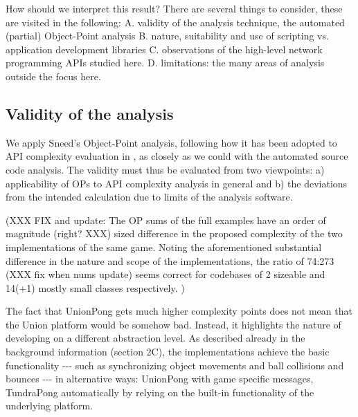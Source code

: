 \documentclass[conference]{IEEEtran}
\begin{document}
How should we interpret this result? There are several things to
consider, these are visited in the following: A. validity of the
analysis technique, the automated (partial) Object-Point
analysis B. nature, suitability and use of scripting vs. application
development libraries C. observations of the high-level network
programming APIs studied here. D. limitations: the many areas of
analysis outside the focus here.


\subsection{Validity of the analysis%
  \label{validity-of-the-analysis}%
}

We apply Sneed's Object-Point analysis, following how it has been
adopted to API complexity evaluation in \cite{api-complexity-analysis}, as
closely as we could with the automated source code analysis. The
validity must thus be evaluated from two viewpoints: a) applicability
of OPs to API complexity analysis in general and b) the deviations
from the intended calculation due to limits of the analysis software.

(XXX FIX and update:
The OP sums of the full examples have an order of magnitude
(right? XXX) sized difference in the proposed complexity of the two
implementations of the same game. Noting the aforementioned
substantial difference in the nature and scope of the implementations,
the ratio of 74:273 (XXX fix when nums update) seems correct for
codebases of 2 sizeable and 14(+1) mostly small classes respectively.
)

The fact that UnionPong gets much higher complexity points does not
mean that the Union platform would be somehow bad. Instead, it
highlights the nature of developing on a different abstraction
level. As described already in the background information (section
2C), the implementations achieve the basic functionality -{}-{}- such as
synchronizing object movements and ball collisions and bounces -{}-{}- in
alternative ways: UnionPong with game specific messages, TundraPong
automatically by relying on the built-in functionality of the
underlying platform.
\end{document}
